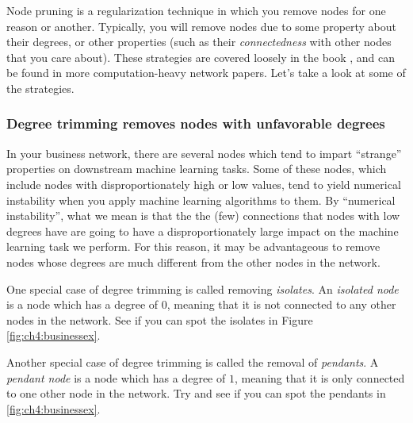 Node pruning is a regularization technique in which you remove nodes for one reason or another. Typically, you will remove nodes due to some property about their degrees, or other properties (such as their \emph{connectedness} with other nodes that you care about). These strategies are covered loosely in the book \cite{Barabsi2013Mar}, and can be found in more computation-heavy network papers. Let's take a look at some of the strategies.

\subsubsection{Degree trimming removes nodes with unfavorable degrees}

In your business network, there are several nodes which tend to impart ``strange'' properties on downstream machine learning tasks. Some of these nodes, which include nodes with disproportionately high or low values, tend to yield numerical instability when you apply machine learning algorithms to them. By ``numerical instability'', what we mean is that the the (few) connections that nodes with low degrees have are going to have a disproportionately large impact on the machine learning task we perform. For this reason, it may be advantageous to remove nodes whose degrees are much different from the other nodes in the network. 

One special case of degree trimming is called removing \emph{isolates}. An \textit{isolated node} is a node which has a degree of $0$, meaning that it is not connected to any other nodes in the network. See if you can spot the isolates in Figure \ref{fig:ch4:businessex}.

Another special case of degree trimming is called the removal of \emph{pendants}. A \textit{pendant node} is a node which has a degree of $1$, meaning that it is only connected to one other node in the network. Try and see if you can spot the pendants in \ref{fig:ch4:businessex}.

